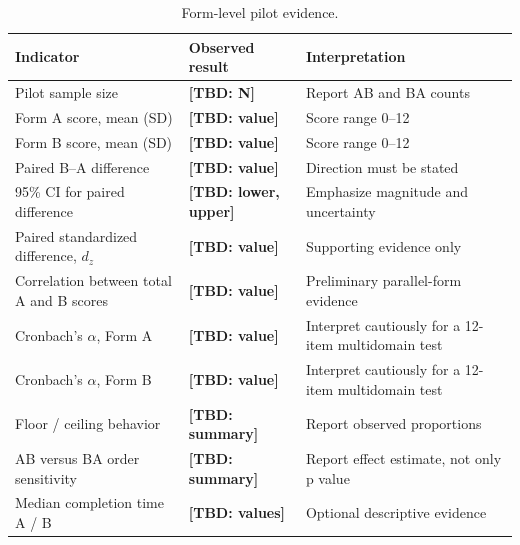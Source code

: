 \documentclass[10pt,a4paper]{article}
\newcommand{\tbd}[1]{\textbf{[TBD: #1]}}
\begin{document}
\begin{table}[htbp]
\centering
\caption{Form-level pilot evidence.}
\label{tab:s2-form-level}
\begin{tabular}{L{0.44\textwidth} C{0.22\textwidth} L{0.25\textwidth}}
\toprule
Indicator & Observed result & Interpretation \\
\midrule
Pilot sample size & \tbd{N} & Report AB and BA counts \\
Form A score, mean (SD) & \tbd{value} & Score range 0--12 \\
Form B score, mean (SD) & \tbd{value} & Score range 0--12 \\
Paired B--A difference & \tbd{value} & Direction must be stated \\
95\% CI for paired difference & \tbd{lower, upper} & Emphasize magnitude and uncertainty \\
Paired standardized difference, $d_z$ & \tbd{value} & Supporting evidence only \\
Correlation between total A and B scores & \tbd{value} & Preliminary parallel-form evidence \\
Cronbach's $\alpha$, Form A & \tbd{value} & Interpret cautiously for a 12-item multidomain test \\
Cronbach's $\alpha$, Form B & \tbd{value} & Interpret cautiously for a 12-item multidomain test \\
Floor / ceiling behavior & \tbd{summary} & Report observed proportions \\
AB versus BA order sensitivity & \tbd{summary} & Report effect estimate, not only p value \\
Median completion time A / B & \tbd{values} & Optional descriptive evidence \\
\bottomrule
\end{tabular}
\end{table}
\end{document}
